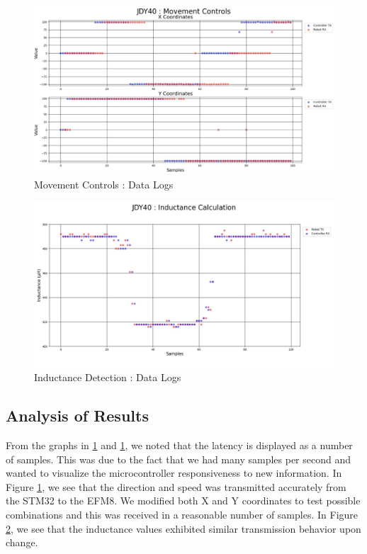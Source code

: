 \documentclass{article}
\begin{document}
\begin{figure}[htbp]
    \centering
    \includegraphics[width=1\textwidth]{Figures/Movement_Logs.jpg}
    \caption{Movement Controls : Data Logs}
    \label{fig:movement_controls_logs}
\end{figure}

\begin{figure}[htbp]
    \centering
    \includegraphics[width=1\textwidth]{Figures/Inductance_Logs.jpg}
    \caption{Inductance Detection : Data Logs}
    \label{fig:inductance_detection_logs}
\end{figure}

\subsection{Analysis of Results}

From the graphs in \ref{fig:movement_controls_logs} and \ref{fig:movement_controls_logs}, we noted that the latency is displayed as a number of samples. This was due to the fact that we had
many samples per second and wanted to visualize the microcontroller responsiveness to new information. In Figure \ref{fig:movement_controls_logs}, we
see that the direction and speed was transmitted accurately from the STM32 to the EFM8. We modified both X and Y coordinates to test possible combinations and this was received in a reasonable number of samples.
In Figure \ref{fig:inductance_detection_logs}, we see that the inductance values exhibited similar transmission behavior upon change.
\end{document}
